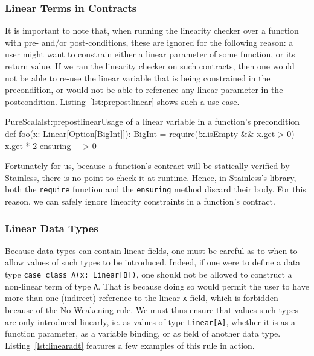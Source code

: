 \documentclass[a4paper,twoside]{article}
\newcommand{\RefCode}[1]{Listing~\ref{#1}}
\newcommand{\stt}[1]{\texttt{\small{#1}}}
\begin{document}
\subsubsection{Linear Terms in Contracts}

It is important to note that, when running the linearity checker over a function with pre- and/or post-conditions, these are ignored for the following reason: a user might want to constrain either a linear parameter of some function, or its return value. If we ran the linearity checker on such contracts, then one would not be able to re-use the linear variable that is being constrained in the precondition, or would not be able to reference any linear parameter in the postcondition. \RefCode{lst:prepostlinear} shows such a use-case.

\begin{Code}{PureScala}{lst:prepostlinear}{Usage of a linear variable in a function's precondition}
def foo(x: Linear[Option[BigInt]]): BigInt = {
  require(!x.isEmpty && x.get > 0)
  x.get * 2
} ensuring { _ > 0 }
\end{Code}

Fortunately for us, because a function's contract will be statically verified by Stainless, there is no point to check it at runtime. Hence, in Stainless's library, both the \stt{require} function and the \stt{ensuring} method discard their body. For this reason, we can safely ignore linearity constraints in a function's contract.\\

\subsubsection{Linear Data Types}

Because data types can contain linear fields, one must be careful as to when to allow values of such types to be introduced. Indeed, if one were to define a data type \stt{case class A(x:\,Linear[B])}, one should not be allowed to construct a non-linear term of type \stt{A}. That is because doing so would permit the user to have more than one (indirect) reference to the linear \stt{x} field, which is forbidden because of the No-Weakening rule. We must thus ensure that values such types are only introduced linearly, ie. as values of type \stt{Linear[A]}, whether it is as a function parameter, as a variable binding, or as field of another data type. \RefCode{lst:linearadt} features a few examples of this rule in action.
\end{document}
